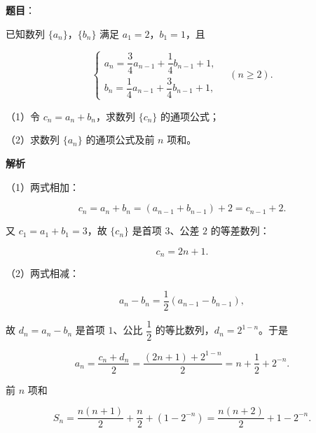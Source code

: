 \begin{answer}

\textbf{题目}：

已知数列 $\{a_n\}$，$\{b_n\}$ 满足 $a_1=2$，$b_1=1$，且

\nopagebreak[4]
\[\begin{cases}a_n=\dfrac34a_{n-1}+\dfrac14b_{n-1}+1,\\ b_n=\dfrac14a_{n-1}+\dfrac34b_{n-1}+1,\end{cases}\quad(n\geqslant2).\]

（1）令 $c_n=a_n+b_n$，求数列 $\{c_n\}$ 的通项公式；

（2）求数列 $\{a_n\}$ 的通项公式及前 $n$ 项和。

\textbf{解析}

（1）两式相加：

\nopagebreak[4]
\[c_n=a_n+b_n=(a_{n-1}+b_{n-1})+2=c_{n-1}+2.\]

又 $c_1=a_1+b_1=3$，故 $\{c_n\}$ 是首项 $3$、公差 $2$ 的等差数列：

\nopagebreak[4]
\[c_n=2n+1.\]

（2）两式相减：

\nopagebreak[4]
\[a_n-b_n=\frac12(a_{n-1}-b_{n-1}),\]

故 $d_n=a_n-b_n$ 是首项 $1$、公比 $\dfrac12$ 的等比数列，$d_n=2^{1-n}$。于是

\nopagebreak[4]
\[a_n=\frac{c_n+d_n}2=\frac{(2n+1)+2^{1-n}}2=n+\frac12+2^{-n}.\]

前 $n$ 项和

\nopagebreak[4]
\[S_n=\frac{n(n+1)}2+\frac n2+\left(1-2^{-n}\right)=\frac{n(n+2)}2+1-2^{-n}.\]


\end{answer}
